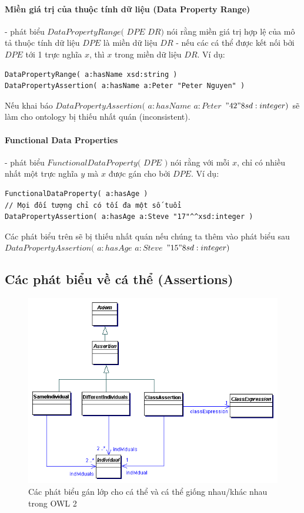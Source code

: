 \paragraph{Miền giá trị của thuộc tính dữ liệu (Data Property Range)} - phát biểu $DataPropertyRange($ $DPE$ $DR)$ nói rằng miền giá trị hợp lệ của mô tả thuộc tính dữ liệu $DPE$ là miền dữ liệu $DR$ - nếu các cá thể được kết nối bởi $DPE$ tới 1 trực nghĩa $x$, thì $x$ trong miền dữ liệu $DR$. Ví dụ:
\begin{verbatim}
DataPropertyRange( a:hasName xsd:string )
DataPropertyAssertion( a:hasName a:Peter "Peter Nguyen" )
\end{verbatim}
Nếu khai báo $DataPropertyAssertion($ $a:hasName$ $a:Peter$ $"42"^^xsd:integer)$ sẽ làm cho ontology bị thiếu nhất quán (inconsistent).

\paragraph{Functional Data Properties} - phát biểu $FunctionalDataProperty($ $DPE$ $)$ nói rằng với mỗi $x$, chỉ có nhiều nhất một trực nghĩa $y$ mà $x$ được gán cho bởi $DPE$. Ví dụ:
\begin{verbatim}
FunctionalDataProperty( a:hasAge )
// Mọi đối tượng chỉ có tối đa một số tuổi
DataPropertyAssertion( a:hasAge a:Steve "17"^^xsd:integer )
\end{verbatim}
Các phát biểu trên sẽ bị thiếu nhất quán nếu chúng ta thêm vào phát biểu sau $DataPropertyAssertion($ $a:hasAge$ $a:Steve$ $"15"^^xsd:integer)$

\subsection{Các phát biểu về cá thể (Assertions)} 
\begin{figure}
	\centering
	\includegraphics[width=120mm]{Figures/abox1.png}
	\caption{Các phát biểu gán lớp cho cá thể và cá thể giống nhau/khác nhau trong OWL 2 \label{overflow}}
\end{figure}

